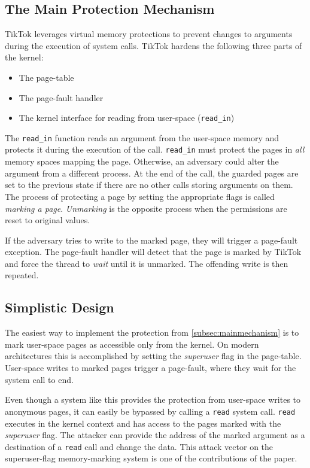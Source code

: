 \documentclass[conference]{IEEEtran}
\newcommand{\sysname}{TikTok}
\begin{document}
\subsection{The Main Protection Mechanism}
\label{subsec:mainmechanism}

\sysname{} leverages virtual memory protections to
prevent changes to arguments during the execution of system calls.
\sysname{} hardens the following three parts of the kernel:

\begin{itemize}
\item The page-table
\item The page-fault handler
\item The kernel interface for reading from user-space (\texttt{read\_in})
\end{itemize}

The \texttt{read\_in} function reads an argument from the user-space memory and
protects it during the execution of the call. \texttt{read\_in} must protect the
pages in \emph{all} memory spaces mapping the page. Otherwise, an adversary
could alter the argument from a different process. At the end of the call, the
guarded pages are set to the previous state if there are no other calls storing
arguments on them. The process of protecting a page by setting the appropriate
flags is called \emph{marking a page}. \emph{Unmarking} is the opposite process
when the permissions are reset to original values.

If the adversary tries to write to the marked page, they will trigger a
page-fault exception. The page-fault handler will detect that the page is marked
by \sysname{} and force the thread to \emph{wait} until it is unmarked. The
offending write is then repeated. 

\subsection{Simplistic Design}
\label{subsec:simplistic}
 The easiest way to implement the
protection from \autoref{subsec:mainmechanism} is to mark user-space pages as
accessible only from the kernel.  On modern architectures this is accomplished
by setting the \emph{superuser} flag in the page-table. User-space writes to
marked pages trigger a page-fault, where they wait for the system call to end.

Even though a system like this provides the protection from user-space
writes to anonymous pages, it can easily be bypassed by calling a \texttt{read}
system call. \texttt{read} executes in the kernel context and has access to 
the pages marked with the \emph{superuser} flag. The attacker can provide the
address of the marked argument as a destination of a \texttt{read} call and 
change the data. This attack vector on the superuser-flag memory-marking system
is one of the contributions of the paper.
\end{document}
